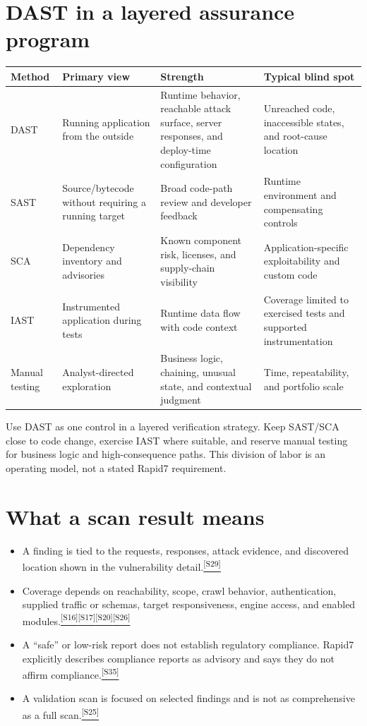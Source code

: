 \documentclass[11pt,letterpaper,oneside]{scrreprt}
\newcommand{\src}[1]{\hyperref[src:#1]{\textsuperscript{\color{R7Orange}[#1]}}}
\begin{document}
\section{DAST in a layered assurance program}
\begin{tabularx}{\textwidth}{@{}P{1.05in}P{1.8in}Y P{1.55in}@{}}
\toprule
\textbf{Method} & \textbf{Primary view} & \textbf{Strength} & \textbf{Typical blind spot}\\
\midrule
DAST & Running application from the outside & Runtime behavior, reachable attack surface, server responses, and deploy-time configuration & Unreached code, inaccessible states, and root-cause location\\
SAST & Source/bytecode without requiring a running target & Broad code-path review and developer feedback & Runtime environment and compensating controls\\
SCA & Dependency inventory and advisories & Known component risk, licenses, and supply-chain visibility & Application-specific exploitability and custom code\\
IAST & Instrumented application during tests & Runtime data flow with code context & Coverage limited to exercised tests and supported instrumentation\\
Manual testing & Analyst-directed exploration & Business logic, chaining, unusual state, and contextual judgment & Time, repeatability, and portfolio scale\\
\bottomrule
\end{tabularx}

\begin{oprec}
Use DAST as one control in a layered verification strategy. Keep SAST/SCA close to code change, exercise IAST where suitable, and reserve manual testing for business logic and high-consequence paths. This division of labor is an operating model, not a stated Rapid7 requirement.
\end{oprec}

\section{What a scan result means}
\begin{itemize}
  \item A finding is tied to the requests, responses, attack evidence, and discovered location shown in the vulnerability detail.\src{S29}
  \item Coverage depends on reachability, scope, crawl behavior, authentication, supplied traffic or schemas, target responsiveness, engine access, and enabled modules.\src{S16}\src{S17}\src{S20}\src{S26}
  \item A ``safe'' or low-risk report does not establish regulatory compliance. Rapid7 explicitly describes compliance reports as advisory and says they do not affirm compliance.\src{S35}
  \item A validation scan is focused on selected findings and is not as comprehensive as a full scan.\src{S25}
\end{itemize}
\end{document}
